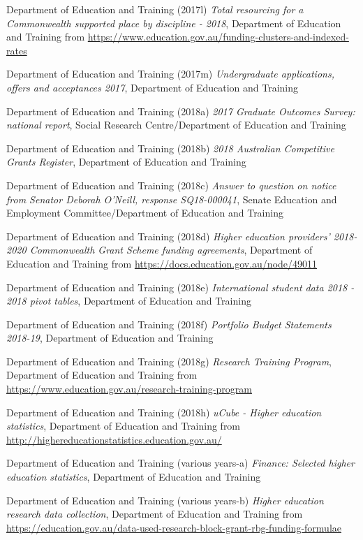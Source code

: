 \documentclass[]{book}
\begin{document}
\protect\hypertarget{_ENREF_78}{}{}Department of Education and Training (2017l) \emph{Total resourcing for a Commonwealth supported place by discipline - 2018}, Department of Education and Training from \url{https://www.education.gov.au/funding-clusters-and-indexed-rates}

Department of Education and Training (2017m) \emph{Undergraduate applications, offers and acceptances 2017}, Department of Education and Training

\protect\hypertarget{_ENREF_80}{}{}Department of Education and Training (2018a) \emph{2017 Graduate Outcomes Survey: national report}, Social Research Centre/Department of Education and Training

Department of Education and Training (2018b) \emph{2018 Australian Competitive Grants Register}, Department of Education and Training

Department of Education and Training (2018c) \emph{Answer to question on notice from Senator Deborah O'Neill, response SQ18-000041}, Senate Education and Employment Committee/Department of Education and Training

Department of Education and Training (2018d) \emph{Higher education providers' 2018-2020 Commonwealth Grant Scheme funding agreements}, Department of Education and Training from \url{https://docs.education.gov.au/node/49011}

Department of Education and Training (2018e) \emph{International student data 2018 - 2018 pivot tables}, Department of Education and Training

\protect\hypertarget{_ENREF_85}{}{}Department of Education and Training (2018f) \emph{Portfolio Budget Statements 2018-19}, Department of Education and Training

Department of Education and Training (2018g) \emph{Research Training Program}, Department of Education and Training from \url{https://www.education.gov.au/research-training-program}

\protect\hypertarget{_ENREF_87}{}{}Department of Education and Training (2018h) \emph{uCube - Higher education statistics}, Department of Education and Training from \url{http://highereducationstatistics.education.gov.au/}

\protect\hypertarget{_ENREF_88}{}{}Department of Education and Training (various years-a) \emph{Finance: Selected higher education statistics}, Department of Education and Training

\protect\hypertarget{_ENREF_89}{}{}Department of Education and Training (various years-b) \emph{Higher education research data collection}, Department of Education and Training from \url{https://education.gov.au/data-used-research-block-grant-rbg-funding-formulae}
\end{document}
